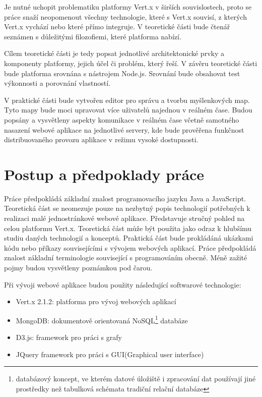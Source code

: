 Je nutné uchopit problematiku platformy Vert.x v širších souvislostech, proto se práce snaží neopomenout všechny technologie, které s Vert.x souvisí, z kterých Vert.x vychází nebo které přímo integruje. V teoretické části bude čtenář seznámen s důležitými filozofiemi, které platforma nabízí. %

Cílem teoretické části je tedy popsat jednotlivé architektonické prvky a komponenty platformy, jejich účel či problém, který řeší. V závěru teoretické části bude platforma srovnána s nástrojem Node.js. Srovnání bude obsahovat test výkonnosti a porovnání vlastností.

V praktické části bude vytvořen editor pro správu a tvorbu myšlenkových map. Tyto mapy bude moci upravovat více uživatelů najednou v reálném čase. Budou popsány a vysvětleny aspekty komunikace v reálném čase včetně samotného nasazení webové aplikace na jednotlivé servery, kde bude prověřena funkčnost distribuovaného provozu aplikace v režimu vysoké dostupnosti.

\section{Postup a předpoklady práce}

Práce předpokládá základní znalost programovacího jazyku Java a JavaScript. Teoretická část se neomezuje pouze na nezbytný popis technologií potřebných k realizaci malé jednostránkové webové aplikace. Představuje stručný pohled na celou platformu Vert.x. Teoretická část může být použita jako odraz k hlubšímu studiu daných technologií a konceptů. Praktická část bude prokládáná ukázkami kódu nebo příkazy souvisejícími s vývojem webových aplikací. Práce předpokládá znalost základní terminologie související s programováním obecně. Méně zažité pojmy budou vysvětleny poznámkou pod čarou.

Při vývoji webové aplikace budou použity následující softwarové technologie:
\begin{itemize}
\item Vert.x 2.1.2: platforma pro vývoj webových aplikací
\item MongoDB: dokumentově orientovaná NoSQL\footnote{databázový koncept, ve kterém datové úložiště i zpracování dat používají jiné prostředky než tabulková schémata tradiční relační databáze} databáze
\item D3.js: framework pro práci s grafy
\item JQuery framework pro práci s GUI(Graphical user interface)
\end{itemize}